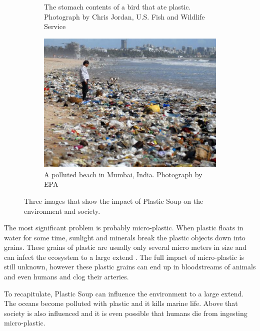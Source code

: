 \begin{figure}
{\begin{minipage}{\widefigwidth}
\begin{subfigure}[t]{.48\textwidth}
	\caption{The stomach contents of a bird that ate plastic. Photograph by Chris Jordan, U.S. Fish and Wildlife Service }
	\label{fig:plastic-bird}
   \end{subfigure}
   \hfill
   \begin{subfigure}[t]{.48\textwidth}
    \ifx\showfig\undefined
	 \includegraphics[keepaspectratio=true,width=\textwidth]{images/plastic-beach.jpg} \fi
	\caption{A polluted beach in Mumbai, India. Photograph by EPA }
	\label{fig:plastic-beach}
   \end{subfigure}
   \caption{Three images that show the impact of Plastic Soup on the environment and society.}%
   \label{fig:plastic-impact}
   \end{minipage}
  }
\end{figure}

The most significant problem is probably micro-plastic.
When plastic floats in water for some time, sunlight and minerals break the plastic objects down into grains.
These grains of plastic are usually only several micro meters in size and can infect the ecosystem to a large extend \citep{moore2011plastic}.
The full impact of micro-plastic is still unknown, however these plastic grains can end up in bloodstreams of animals and even humans and clog their arteries.

To recapitulate, Plastic Soup can influence the environment to a large extend.
The oceans become polluted with plastic and it kills marine life. Above that society is also influenced and it is even possible that humans die from ingesting micro-plastic.

